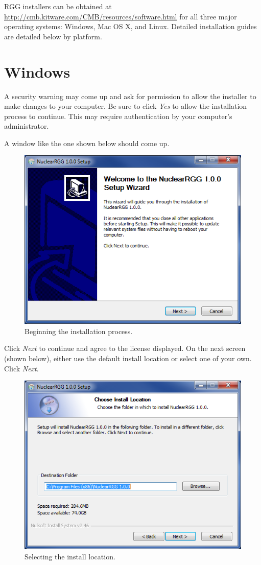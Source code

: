 RGG installers can be obtained at \url{http://cmb.kitware.com/CMB/resources/software.html} for all three major operating systems: Windows, Mac OS X, and Linux.  Detailed installation guides are detailed below by platform.

\section{Windows}
A security warning may come up and ask for permission to allow the installer to make changes to your computer.  Be sure to click \emph{Yes} to allow the installation process to continue.  This may require authentication by your computer's administrator.

A window like the one shown below should come up.

\begin{figure}[H]
	\begin{center}
		\includegraphics[width=0.5\linewidth]{Images/windows-install-1.png}
		\caption{Beginning the installation process.}
		\label{fig:WindowsInstall1}
	\end{center}
\end{figure}

Click \emph{Next} to continue and agree to the license displayed.  On the next screen (shown below), either use the default install location or select one of your own.  Click \emph{Next}.

\begin{figure}[H]
	\begin{center}
		\includegraphics[width=0.5\linewidth]{Images/windows-install-2.png}
		\caption{Selecting the install location.}
		\label{fig:WindowsInstall2}
	\end{center}
\end{figure}

